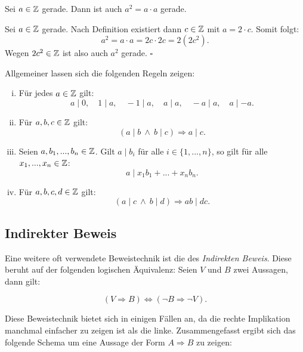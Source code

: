 \begin{proposition}
Sei $a \in \mathbb{Z}$ gerade.
Dann ist auch $a^2 = a \cdot a$ gerade.
\end{proposition}

\begin{proof*}
Sei $a \in \mathbb{Z}$ gerade.
Nach Definition existiert dann $c \in \mathbb{Z}$ mit $a = 2 \cdot c$.
Somit folgt:
\[
  a^2 = a \cdot a = 2c \cdot 2c = 2(2c^2).
\]
Wegen $2c^2 \in \mathbb{Z}$ ist also auch $a^2$ gerade.
\hfill $\square$
\end{proof*}


\vspace*{3em}
Allgemeiner lassen sich die folgenden Regeln zeigen:


\begin{theorem}
\begin{enumerate}[(i)]
\item Für jedes $a \in \mathbb{Z}$ gilt:
\[
  a \mid 0, \quad 1 \mid a, \quad -1 \mid a,  \quad a \mid a, \quad -a \mid a,
  \quad a \mid -a .
\]

\item Für $a,b,c \in \mathbb{Z}$ gilt:
\[
  (a \mid b \ \wedge \ b \mid c) \Rightarrow a \mid c .
\]

\item Seien $a,b_1,...,b_n \in \mathbb{Z}$.
Gilt $a \mid b_i$ für alle $i \in \{1,...,n\}$,
so gilt für alle $x_1,...,x_n \in \mathbb{Z}$:
\[
  a \mid x_1 b_1 + ... + x_n b_n .
\]

\item Für $a,b,c,d \in \mathbb{Z}$ gilt:
\[
  (a \mid c \ \wedge  \ b \mid d) \Rightarrow ab \mid dc .
\]
\end{enumerate}
\end{theorem}


\begin{proof*}
\end{proof*}


\subsection{Indirekter Beweis}
Eine weitere oft verwendete Beweistechnik ist die des
\textit{Indirekten Beweis}.
Diese beruht auf der folgenden logischen Äquivalenz:
Seien $V$ und $B$ zwei Aussagen, dann gilt:

\[
    (V \Rightarrow B) \iff (\neg B \Rightarrow \neg V).
\]

Diese Beweistechnik bietet sich in einigen Fällen an, da die rechte Implikation
manchmal einfacher zu zeigen ist als die linke.
Zusammengefasst ergibt sich das folgende Schema um eine Aussage der Form
$A \Rightarrow B$ zu zeigen:


